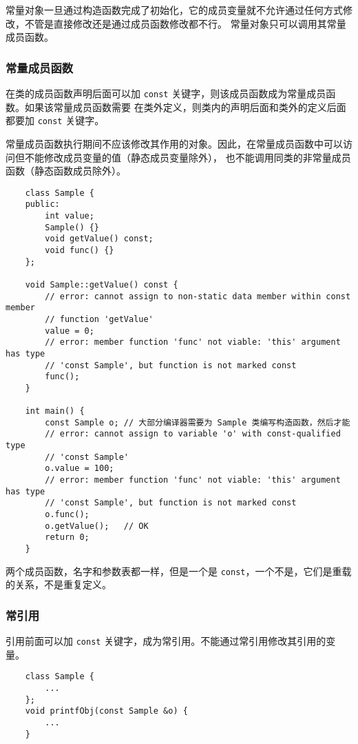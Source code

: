 \documentclass[UTF8]{ctexart}
\begin{document}
常量对象一旦通过构造函数完成了初始化，它的成员变量就不允许通过任何方式修改，不管是直接修改还是通过成员函数修改都不行。
常量对象只可以调用其常量成员函数。

\subsubsection{常量成员函数}
在类的成员函数声明后面可以加 \texttt{const} 关键字，则该成员函数成为常量成员函数。如果该常量成员函数需要
在类外定义，则类内的声明后面和类外的定义后面都要加 \texttt{const} 关键字。

常量成员函数执行期间不应该修改其作用的对象。因此，在常量成员函数中可以访问但不能修改成员变量的值（静态成员变量除外），
也不能调用同类的非常量成员函数（静态函数成员除外）。

\begin{verbatim}
    class Sample {
    public:
        int value;
        Sample() {}
        void getValue() const;
        void func() {}
    };

    void Sample::getValue() const {
        // error: cannot assign to non-static data member within const member
        // function 'getValue'
        value = 0;
        // error: member function 'func' not viable: 'this' argument has type
        // 'const Sample', but function is not marked const
        func();
    }

    int main() {
        const Sample o; // 大部分编译器需要为 Sample 类编写构造函数，然后才能
        // error: cannot assign to variable 'o' with const-qualified type
        // 'const Sample'
        o.value = 100;
        // error: member function 'func' not viable: 'this' argument has type
        // 'const Sample', but function is not marked const
        o.func();
        o.getValue();   // OK
        return 0;
    }
\end{verbatim}

两个成员函数，名字和参数表都一样，但是一个是 \texttt{const}，一个不是，它们是重载的关系，不是重复定义。

\subsubsection{常引用}
引用前面可以加 \texttt{const} 关键字，成为常引用。不能通过常引用修改其引用的变量。
\begin{verbatim}
    class Sample {
        ...
    };
    void printfObj(const Sample &o) {
        ...
    }
\end{verbatim}
\end{document}
